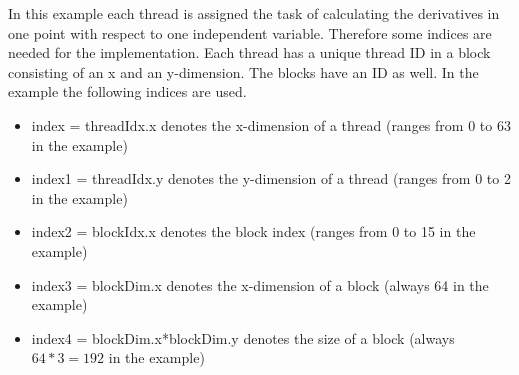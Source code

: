 \documentclass[11pt,twoside]{article}
\begin{document}
In this example each thread is assigned the task of calculating the 
derivatives in one point with respect to one independent variable. Therefore
some indices are needed for the implementation. Each thread has a unique thread
ID in a block consisting of an x and an y-dimension. The blocks have an ID as
well. In the example the following indices are used.
 
\begin{itemize}
 \item {\sf index = threadIdx.x} denotes the x-dimension of a thread (ranges from 0 to 63 in the example)
 \item {\sf index1 = threadIdx.y} denotes the y-dimension of a thread (ranges from 0 to 2 in the example)
 \item {\sf index2 = blockIdx.x} denotes the block index (ranges from 0 to 15 in the example)
 \item {\sf index3 = blockDim.x} denotes the x-dimension of a block (always 64 in the example)
 \item {\sf index4 = blockDim.x*blockDim.y} denotes the size of a block (always $64*3=192$ in the example)
\end{itemize}
\end{document}
